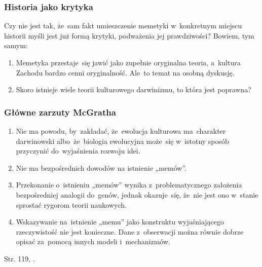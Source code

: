\documentclass[10pt,t]{beamer}
\begin{document}
\begin{frame}
  \frametitle{Historia jako krytyka}


  Czy nie jest tak, że~sam fakt
  umieszczenie memetyki w~konkretnym miejscu historii myśli jest już
  formą krytyki, podważenia jej prawdziwości? Bowiem, tym samym:

  \begin{enumerate}
    \RaggedRight

  \item Memetyka przestaje~się jawić jako zupełnie oryginalna
    teoria, a~kultura Zachodu bardzo cenni oryginalność. Ale~to
    temat na osobną dyskusję.

  \item Skoro istnieje wiele teorii kulturowego darwinizmu, to która
    jest poprawna?

  \end{enumerate}

\end{frame}





\begin{frame}
  \frametitle{Główne zarzuty McGratha}


  \begin{enumerate}
    \RaggedRight

  \item Nie ma powodu, by~zakładać, że~ewolucja kulturowa
    ma~charakter darwinowski albo~że~biologia ewolucyjna może~się
    w~istotny sposób przyczynić do~wyjaśnienia rozwoju idei.

  \item Nie ma bezpośrednich dowodów na istnienie „memów”.

  \item Przekonanie o~istnieniu „memów” wynika z~problematycznego
    założenia bezpośredniej analogii do~genów, jednak okazuje~się,
    że~nie jest ono w~stanie sprostać rygorom teorii naukowych.

  \item Wskazywanie na~istnienie „memu” jako konstruktu
    wyjaśniającego rzeczywistość nie jest konieczne. Dane
    z~obserwacji można równie dobrze opisać za~pomocą innych modeli
    i~mechanizmów.

  \end{enumerate}

  Str. 119, \cite{McGrathBogDawkinsa2008}.

\end{frame}
\end{document}
